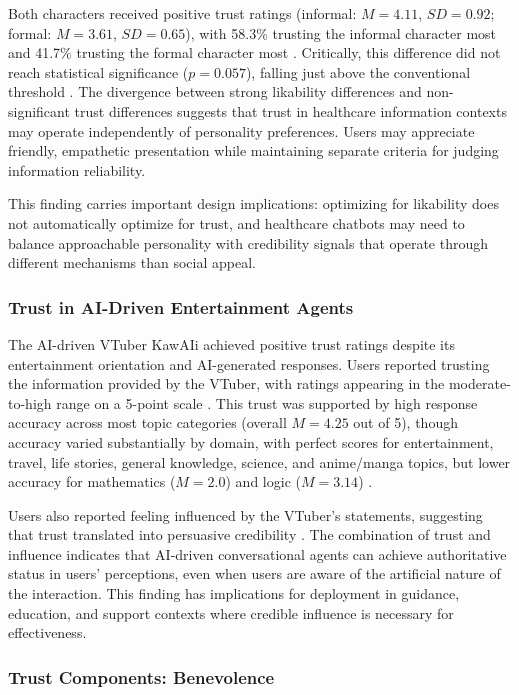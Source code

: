 \documentclass[manuscript,anonymous,sigconf]{acmart}
\begin{document}
Both characters received positive trust ratings (informal: $M = 4.11$, $SD = 0.92$; formal: $M = 3.61$, $SD = 0.65$), with 58.3\% trusting the informal character most and 41.7\% trusting the formal character most \cite{A79}. Critically, this difference did not reach statistical significance ($p = 0.057$), falling just above the conventional threshold \cite{A79}. The divergence between strong likability differences and non-significant trust differences suggests that trust in healthcare information contexts may operate independently of personality preferences. Users may appreciate friendly, empathetic presentation while maintaining separate criteria for judging information reliability.

This finding carries important design implications: optimizing for likability does not automatically optimize for trust, and healthcare chatbots may need to balance approachable personality with credibility signals that operate through different mechanisms than social appeal.

\subsubsection{Trust in AI-Driven Entertainment Agents}

The AI-driven VTuber KawAIi achieved positive trust ratings despite its entertainment orientation and AI-generated responses. Users reported trusting the information provided by the VTuber, with ratings appearing in the moderate-to-high range on a 5-point scale \cite{A81}. This trust was supported by high response accuracy across most topic categories (overall $M = 4.25$ out of 5), though accuracy varied substantially by domain, with perfect scores for entertainment, travel, life stories, general knowledge, science, and anime/manga topics, but lower accuracy for mathematics ($M = 2.0$) and logic ($M = 3.14$) \cite{A81}.

Users also reported feeling influenced by the VTuber's statements, suggesting that trust translated into persuasive credibility \cite{A81}. The combination of trust and influence indicates that AI-driven conversational agents can achieve authoritative status in users' perceptions, even when users are aware of the artificial nature of the interaction. This finding has implications for deployment in guidance, education, and support contexts where credible influence is necessary for effectiveness.

\subsubsection{Trust Components: Benevolence}
\end{document}
